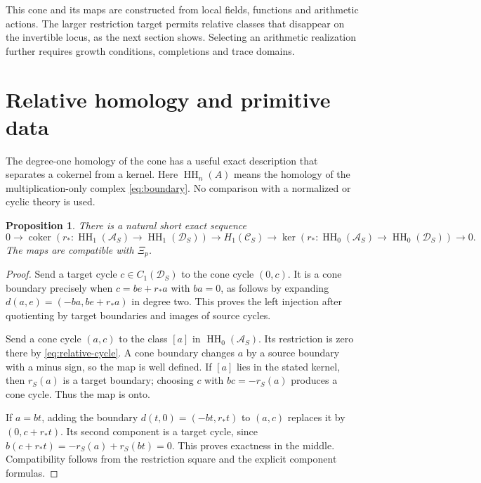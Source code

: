 \documentclass[11pt,letterpaper]{article}
\newtheorem{proposition}[theorem]{Proposition}
\theoremstyle{definition}
\theoremstyle{remark}
\newcommand{\Acal}{\mathcal A}
\newcommand{\HH}{\operatorname{HH}}
\begin{document}
This cone and its maps are constructed from local fields, functions
and arithmetic actions. The larger restriction target permits
relative classes that disappear on the invertible locus, as the
next section shows. Selecting an arithmetic realization further
requires growth conditions, completions and trace domains.

\section{Relative homology and primitive data}

The degree-one homology of the cone has a useful exact description
that separates a cokernel from a kernel. Here $\HH_n(A)$ means the
homology of the multiplication-only complex \eqref{eq:boundary}.
No comparison with a normalized or cyclic theory is used.

\begin{proposition}\label{prop:cone-exact}
There is a natural short exact sequence
\begin{equation}
 0\longrightarrow\operatorname{coker}(r_*:\HH_1(\Acal_S)\to\HH_1(\mathscr D_S))
 \longrightarrow H_1(\mathscr C_S)
 \longrightarrow\ker(r_*:\HH_0(\Acal_S)\to\HH_0(\mathscr D_S))
 \longrightarrow0.
 \label{eq:cone-exact}
\end{equation}
The maps are compatible with $\Xi_p$.
\end{proposition}
\begin{proof}
Send a target cycle $c\in C_1(\mathscr D_S)$ to the cone cycle
$(0,c)$. It is a cone boundary precisely when
$c=be+r_*a$ with $ba=0$, as follows by expanding
$d(a,e)=(-ba,be+r_*a)$ in degree two. This proves the left
injection after quotienting by target boundaries and images of
source cycles.

Send a cone cycle $(a,c)$ to the class $[a]$ in $\HH_0(\Acal_S)$.
Its restriction is zero there by \eqref{eq:relative-cycle}.
A cone boundary changes $a$ by a source boundary with a minus
sign, so the map is well defined. If $[a]$ lies in the stated
kernel, then $r_S(a)$ is a target boundary; choosing $c$ with
$bc=-r_S(a)$ produces a cone cycle. Thus the map is onto.

If $a=bt$, adding the boundary $d(t,0)=(-bt,r_*t)$ to
$(a,c)$ replaces it by $(0,c+r_*t)$. Its second component is a
target cycle, since $b(c+r_*t)=-r_S(a)+r_S(bt)=0$.
This proves exactness in the middle. Compatibility follows from
the restriction square and the explicit component formulas.
\end{proof}
\end{document}
